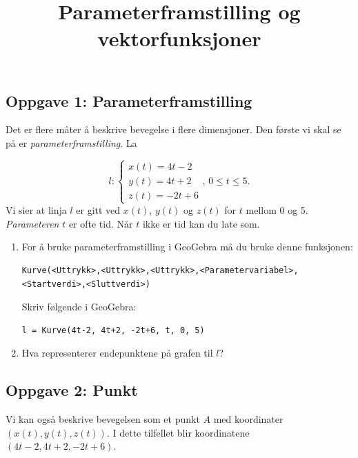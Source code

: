 \documentclass[a4paper,12pt]{article}
\title{Parameterframstilling og vektorfunksjoner}
\author{}
\date{}
\begin{document}
\maketitle

\subsection*{Oppgave 1: Parameterframstilling}

Det er flere måter å beskrive bevegelse i flere dimensjoner. Den første vi skal se på er \textit{parameterframstilling}. La

\[
l:
\begin{cases}
x(t)=4t - 2 \\
y(t)=4t+2 \\
z(t)= -2t +6
\end{cases},\, 0 \leq t \leq 5.
\]
Vi sier at linja $l$ er gitt ved $x(t)$, $y(t)$ og $z(t)$ for $t$ mellom 0 og 5. \textit{Parameteren} $t$ er ofte tid. Når $t$ ikke er tid kan du late som.

\begin{enumerate}[label=\alph*)]
\item For å bruke parameterframstilling i GeoGebra må du bruke denne funksjonen:
\begin{lstlisting}
Kurve(<Uttrykk>,<Uttrykk>,<Uttrykk>,<Parametervariabel>,<Startverdi>,<Sluttverdi>)
\end{lstlisting}
Skriv følgende i GeoGebra:
\begin{lstlisting}
l = Kurve(4t-2, 4t+2, -2t+6, t, 0, 5)
\end{lstlisting}

\item Hva representerer endepunktene på grafen til $l$?
\end{enumerate}


\subsection*{Oppgave 2: Punkt}

Vi kan også beskrive bevegelsen som et punkt $A$ med koordinater $(x(t),y(t),z(t))$. I dette tilfellet blir koordinatene $(4t-2,4t+2,-2t+6)$.
\end{document}
